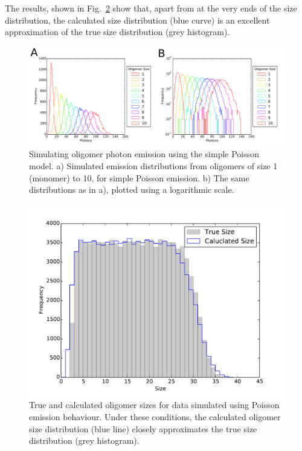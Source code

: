 The results, shown in Fig.~\ref{fig:Poisson_size_photons_uniform} show that, apart from at the very ends of the size distribution, the calculated size distribution (blue curve) is an excellent approximation of the true size distribution (grey histogram).        

\begin{figure}
   \begin{center}
      \includegraphics*[clip=true, width=6.5in]{sizing/poisson_size_photons.pdf}
      \caption{Simulating oligomer photon emission using the simple Poisson model. a) Simulated emission distributions from oligomers of size 1 (monomer) to 10, for simple Poisson emission. b) The same distributions as in a), plotted using a logarithmic scale.}
      \label{fig:Poisson_size_photons}
   \end{center}
\end{figure}


\begin{figure}
   \begin{center}
      \includegraphics*[clip=true, width=6in]{sizing/True_vs_Measured_oligomer_events_uniform_poisson_100000_hist.pdf}
      \caption{True and calculated oligomer sizes for data simulated using Poisson emission behaviour. Under these conditions, the calculated oligomer size distribution (blue line) closely approximates the true size distribution (grey histogram).}
      \label{fig:Poisson_size_photons_uniform}
   \end{center}
\end{figure}

